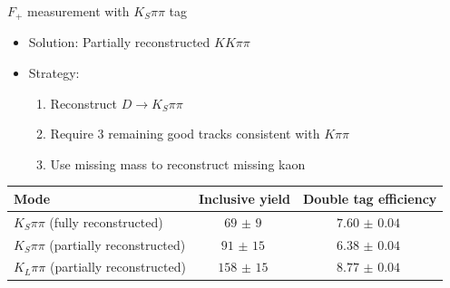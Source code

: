 \documentclass{beamer}
\begin{document}
\begin{frame}{$F_+$ measurement with $K_S\pi\pi$ tag}
  \begin{itemize}
    \setlength\itemsep{1.0em}
    \item{Solution: Partially reconstructed $KK\pi\pi$}
    \item{Strategy:}
    \begin{enumerate}
      \setlength\itemsep{0.5em}
      \item{Reconstruct $D\to K_S\pi\pi$}
      \item{Require 3 remaining good tracks consistent with $K\pi\pi$}
      \item{Use missing mass to reconstruct missing kaon}
    \end{enumerate}
  \end{itemize}
  \vspace{0.5cm}
  \def\arraystretch{1.2}%
  \begin{tabular}{lcc}
    Mode                                     & Inclusive yield  & Double tag efficiency \\
    \hline
    $K_S\pi\pi$ (fully reconstructed)        & $\SI{69(9)}{}$   & $\SI{7.60(4)}{}$ \\
    $K_S\pi\pi$ (partially reconstructed)    & $\SI{91(15)}{}$  & $\SI{6.38(4)}{}$ \\
    $K_L\pi\pi$ (partially reconstructed)    & $\SI{158(15)}{}$ & $\SI{8.77(4)}{}$ \\
    \hline
  \end{tabular}
\end{frame}
\end{document}
